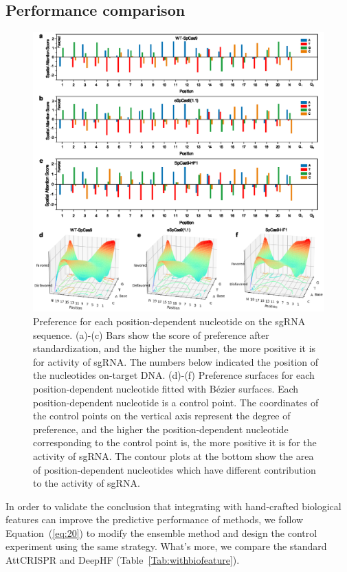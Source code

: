 \documentclass{bioinfo}
\begin{document}
\subsection{Performance comparison}\label{section:comparison}

\begin{figure}[!tpb]
    \centerline{\includegraphics[width=178mm]{spatialattention.eps}}
    \caption{Preference for each position-dependent nucleotide on the sgRNA sequence. 
(a)-(c) Bars show the score of preference after standardization, and the higher the number, the more positive it is for activity of sgRNA. 
The numbers below indicated the position of the nucleotides on-target DNA. 
(d)-(f) Preference surfaces for each position-dependent nucleotide fitted with Bézier surfaces. 
Each position-dependent nucleotide is a control point. 
The coordinates of the control points on the vertical axis represent the degree of preference, 
and the higher the position-dependent nucleotide corresponding to the control point is, the more positive it is for the activity of sgRNA.
The contour plots at the bottom show the area of position-dependent nucleotides which have different contribution to the activity of sgRNA. 
}\label{fig:spatialattention}
\end{figure}

In order to validate the conclusion that integrating with hand-crafted biological features can improve the predictive performance of methods, 
we follow Equation~(\ref{eq:20}) to modify the ensemble method and design the control experiment using the same strategy. 
What's more, we compare the standard AttCRISPR and DeepHF (Table~\ref{Tab:withbiofeature}).
\end{document}
